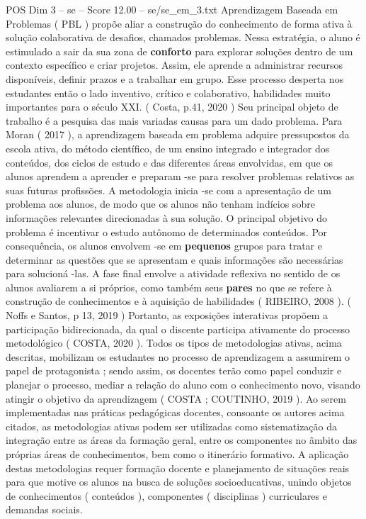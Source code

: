 \begin{textsample}{POS Dim 3 – se – Score 12.00 – se/se\_em\_3.txt}
Aprendizagem Baseada em Problemas ( PBL ) propõe aliar a construção do conhecimento de forma ativa à solução colaborativa de desafios, chamados problemas.
Nessa estratégia, o aluno é estimulado a sair da sua zona de \textbf{conforto} para explorar soluções dentro de um contexto específico e criar projetos.
Assim, ele aprende a administrar recursos disponíveis, definir prazos e a trabalhar em grupo.
Esse processo desperta nos estudantes então o lado inventivo, crítico e colaborativo, habilidades muito importantes para o século XXI. ( Costa, p.41, 2020 ) Seu principal objeto de trabalho é a pesquisa das mais variadas causas para um dado problema.
Para Moran ( 2017 ), a aprendizagem baseada em problema adquire pressupostos da escola ativa, do método científico, de um ensino integrado e integrador dos conteúdos, dos ciclos de estudo e das diferentes áreas envolvidas, em que os alunos aprendem a aprender e preparam -se para resolver problemas relativos as suas futuras profissões.
A metodologia inicia -se com a apresentação de um problema aos alunos, de modo que os alunos não tenham indícios sobre informações relevantes direcionadas à sua solução.
O principal objetivo do problema é incentivar o estudo autônomo de determinados conteúdos.
Por consequência, os alunos envolvem -se em \textbf{pequenos} grupos para tratar e determinar as questões que se apresentam e quais informações são necessárias para solucioná -las.
A fase final envolve a atividade reflexiva no sentido de os alunos avaliarem a si próprios, como também seus \textbf{pares} no que se refere à construção de conhecimentos e à aquisição de habilidades ( RIBEIRO, 2008 ). ( Noffs e Santos, p 13, 2019 ) Portanto, as exposições interativas propõem a participação bidirecionada, da qual o discente participa ativamente do processo metodológico ( COSTA, 2020 ).
Todos os tipos de metodologias ativas, acima descritas, mobilizam os estudantes no processo de aprendizagem a assumirem o papel de protagonista ; sendo assim, os docentes terão como papel conduzir e planejar o processo, mediar a relação do aluno com o conhecimento novo, visando atingir o objetivo da aprendizagem ( COSTA ; COUTINHO, 2019 ).
Ao serem implementadas nas práticas pedagógicas docentes, consoante os autores acima citados, as metodologias ativas podem ser utilizadas como sistematização da integração entre as áreas da formação geral, entre os componentes no âmbito das próprias áreas de conhecimentos, bem como o itinerário formativo.
A aplicação destas metodologias requer formação docente e planejamento de situações reais para que motive os alunos na busca de soluções socioeducativas, unindo objetos de conhecimentos ( conteúdos ), componentes ( disciplinas ) curriculares e demandas sociais.

\end{textsample}
